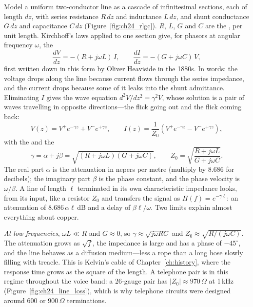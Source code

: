 Model a uniform two-conductor line as a cascade of infinitesimal sections, each of length
$dz$, with series resistance $R\,dz$ and inductance $L\,dz$, and shunt conductance $G\,dz$ and
capacitance $C\,dz$ (Figure~\ref{fig:ch24_rlgc}). $R$, $L$, $G$ and $C$ are the , per unit length. Kirchhoff's laws applied to one section give, for phasors at angular
frequency $\omega$, the 
\begin{equation}
\frac{dV}{dz}=-(R+j\omega L)\,I,\qquad \frac{dI}{dz}=-(G+j\omega C)\,V,
\label{eq:ch24:telegrapher}
\end{equation}
first written down in this form by Oliver Heaviside in the 1880s. In words: the voltage drops along
the line because current flows through the series impedance, and the current drops because some of
it leaks into the shunt admittance. Eliminating $I$ gives the wave equation $d^2V/dz^2=\gamma^2V$,
whose solution is a pair of waves travelling in opposite directions---the flick going out and the
flick coming back:
\begin{equation}
V(z)=V^+e^{-\gamma z}+V^-e^{+\gamma z},\qquad
I(z)=\frac{1}{Z_0}\left(V^+e^{-\gamma z}-V^-e^{+\gamma z}\right),
\end{equation}
with the  and the 
\begin{equation}
\gamma=\alpha+j\beta=\sqrt{(R+j\omega L)(G+j\omega C)},\qquad
Z_0=\sqrt{\frac{R+j\omega L}{G+j\omega C}}.
\label{eq:ch24:gammaz0}
\end{equation}
The real part $\alpha$ is the attenuation in nepers per metre (multiply by 8.686 for decibels);
the imaginary part $\beta$ is the phase constant, and the phase velocity is $\omega/\beta$. A
line of length $\ell$ terminated in its own characteristic impedance looks, from its input,
like a resistor $Z_0$ and transfers the signal as $H(f)=e^{-\gamma\ell}$: an attenuation of
$8.686\,\alpha\ell$\,dB and a delay of $\beta\ell/\omega$. Two limits explain almost everything
about copper.

\emph{At low frequencies}, $\omega L\ll R$ and $G\approx0$, so $\gamma\approx\sqrt{j\omega RC}$
and $Z_0\approx\sqrt{R/(j\omega C)}$. The attenuation grows as $\sqrt f$, the impedance is large
and has a phase of $-45^\circ$, and the line behaves as a diffusion medium---less a rope than a
long hose slowly filling with treacle. This is Kelvin's cable of Chapter~\ref{ch:history}, where
the response time grows as the square of the length. A telephone pair is in this regime throughout
the voice band: a 26-gauge pair has $|Z_0|\approx970$\,$\Omega$ at 1\,kHz
(Figure~\ref{fig:ch24_line_loss}), which is why telephone circuits were designed around 600 or
900\,$\Omega$ terminations.

